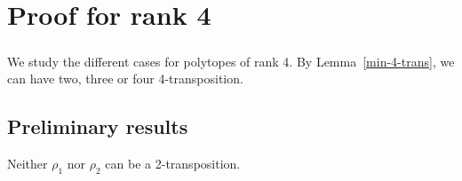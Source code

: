 \chapter{Proof for rank 4}
\label{proof-4}

\paragraph{}
We study the different cases for polytopes of rank 4. By Lemma~\ref{min-4-trans}, we can have two, three or four 4-transposition.

\section{Preliminary results}

\begin{theorem}
  Neither $\rho_1$ nor $\rho_2$ can be a 2-transposition.
\end{theorem}

